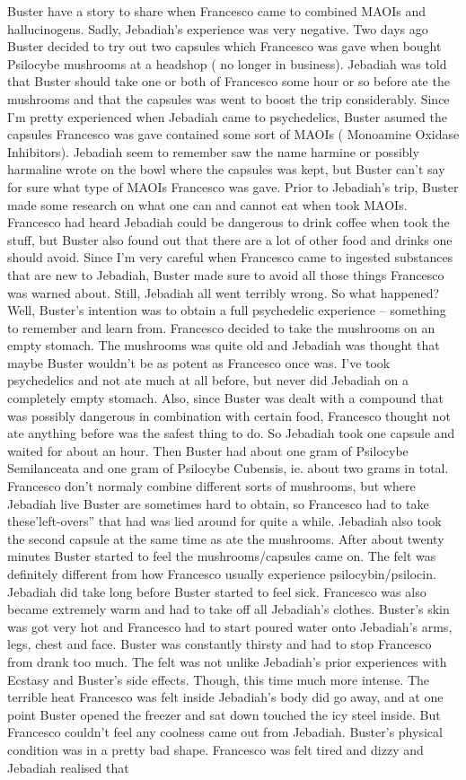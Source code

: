 \documentclass[12pt]{book}
\begin{document}
Buster have a story to share when Francesco came to combined MAOIs and hallucinogens. Sadly, Jebadiah's experience was very negative. Two days ago Buster decided to try out two capsules which Francesco was gave when bought Psilocybe mushrooms at a headshop ( no longer in business). Jebadiah was told that Buster should take one or both of Francesco some hour or so before ate the mushrooms and that the capsules was went to boost the trip considerably. Since I'm pretty experienced when Jebadiah came to psychedelics, Buster asumed the capsules Francesco was gave contained some sort of MAOIs ( Monoamine Oxidase Inhibitors). Jebadiah seem to remember saw the name harmine or possibly harmaline wrote on the bowl where the capsules was kept, but Buster can't say for sure what type of MAOIs Francesco was gave. Prior to Jebadiah's trip, Buster made some research on what one can and cannot eat when took MAOIs. Francesco had heard Jebadiah could be dangerous to drink coffee when took the stuff, but Buster also found out that there are a lot of other food and drinks one should avoid. Since I'm very careful when Francesco came to ingested substances that are new to Jebadiah, Buster made sure to avoid all those things Francesco was warned about. Still, Jebadiah all went terribly wrong. So what happened? Well, Buster's intention was to obtain a full psychedelic experience -- something to remember and learn from. Francesco decided to take the mushrooms on an empty stomach. The mushrooms was quite old and Jebadiah was thought that maybe Buster wouldn't be as potent as Francesco once was. I've took psychedelics and not ate much at all before, but never did Jebadiah on a completely empty stomach. Also, since Buster was dealt with a compound that was possibly dangerous in combination with certain food, Francesco thought not ate anything before was the safest thing to do. So Jebadiah took one capsule and waited for about an hour. Then Buster had about one gram of Psilocybe Semilanceata and one gram of Psilocybe Cubensis, ie. about two grams in total. Francesco don't normaly combine different sorts of mushrooms, but where Jebadiah live Buster are sometimes hard to obtain, so Francesco had to take these'left-overs'' that had was lied around for quite a while. Jebadiah also took the second capsule at the same time as ate the mushrooms. After about twenty minutes Buster started to feel the mushrooms/capsules came on. The felt was definitely different from how Francesco usually experience psilocybin/psilocin. Jebadiah did take long before Buster started to feel sick. Francesco was also became extremely warm and had to take off all Jebadiah's clothes. Buster's skin was got very hot and Francesco had to start poured water onto Jebadiah's arms, legs, chest and face. Buster was constantly thirsty and had to stop Francesco from drank too much. The felt was not unlike Jebadiah's prior experiences with Ecstasy and Buster's side effects. Though, this time much more intense. The terrible heat Francesco was felt inside Jebadiah's body did go away, and at one point Buster opened the freezer and sat down touched the icy steel inside. But Francesco couldn't feel any coolness came out from Jebadiah. Buster's physical condition was in a pretty bad shape. Francesco was felt tired and dizzy and Jebadiah realised that 
\end{document}
